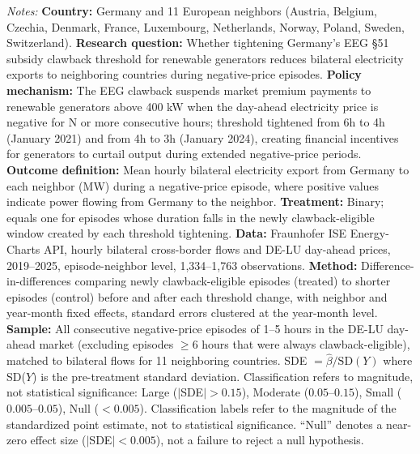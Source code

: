 \begin{table}[H]
\begin{minipage}{\textwidth}
\footnotesize\textit{Notes:} \textbf{Country:} Germany and 11 European neighbors (Austria, Belgium, Czechia, Denmark, France, Luxembourg, Netherlands, Norway, Poland, Sweden, Switzerland). \textbf{Research question:} Whether tightening Germany's EEG \S 51 subsidy clawback threshold for renewable generators reduces bilateral electricity exports to neighboring countries during negative-price episodes. \textbf{Policy mechanism:} The EEG clawback suspends market premium payments to renewable generators above 400 kW when the day-ahead electricity price is negative for N or more consecutive hours; threshold tightened from 6h to 4h (January 2021) and from 4h to 3h (January 2024), creating financial incentives for generators to curtail output during extended negative-price periods. \textbf{Outcome definition:} Mean hourly bilateral electricity export from Germany to each neighbor (MW) during a negative-price episode, where positive values indicate power flowing from Germany to the neighbor. \textbf{Treatment:} Binary; equals one for episodes whose duration falls in the newly clawback-eligible window created by each threshold tightening. \textbf{Data:} Fraunhofer ISE Energy-Charts API, hourly bilateral cross-border flows and DE-LU day-ahead prices, 2019--2025, episode-neighbor level, 1,334--1,763 observations. \textbf{Method:} Difference-in-differences comparing newly clawback-eligible episodes (treated) to shorter episodes (control) before and after each threshold change, with neighbor and year-month fixed effects, standard errors clustered at the year-month level. \textbf{Sample:} All consecutive negative-price episodes of 1--5 hours in the DE-LU day-ahead market (excluding episodes $\geq$6 hours that were always clawback-eligible), matched to bilateral flows for 11 neighboring countries. SDE $= \hat{\beta} / \text{SD}(Y)$ where SD($Y$) is the pre-treatment standard deviation. Classification refers to magnitude, not statistical significance: Large ($|$SDE$| > 0.15$), Moderate ($0.05$--$0.15$), Small ($0.005$--$0.05$), Null ($< 0.005$). Classification labels refer to the magnitude of the standardized point estimate, not to statistical significance. ``Null'' denotes a near-zero effect size ($|$SDE$| < 0.005$), not a failure to reject a null hypothesis.
\end{minipage}
\end{table}
